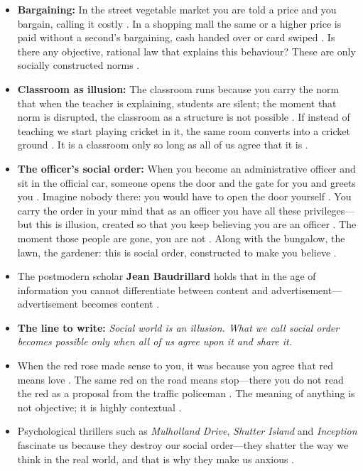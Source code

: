 \begin{ExampleBox}
\begin{itemize}
    \item \textbf{Bargaining:} In the street vegetable market you are told a price and you bargain, calling it costly . In a shopping mall the same or a higher price is paid without a second's bargaining, cash handed over or card swiped . Is there any objective, rational law that explains this behaviour? These are only socially constructed norms .
    \item \textbf{Classroom as illusion:} The classroom runs because you carry the norm that when the teacher is explaining, students are silent; the moment that norm is disrupted, the classroom as a structure is not possible . If instead of teaching we start playing cricket in it, the same room converts into a cricket ground . It is a classroom only so long as all of us agree that it is .
    \item \textbf{The officer's social order:} When you become an administrative officer and sit in the official car, someone opens the door and the gate for you and greets you . Imagine nobody there: you would have to open the door yourself . You carry the order in your mind that as an officer you have all these privileges---but this is illusion, created so that you keep believing you are an officer . The moment those people are gone, you are not . Along with the bungalow, the lawn, the gardener: this is social order, constructed to make you believe .
\end{itemize}
\end{ExampleBox}

\begin{CriticalPoint}
\begin{itemize}
    \item The postmodern scholar \textbf{Jean Baudrillard} holds that in the age of information you cannot differentiate between content and advertisement---advertisement becomes content .
    \item \textbf{The line to write:} \textit{Social world is an illusion. What we call social order becomes possible only when all of us agree upon it and share it.} 
    \item When the red rose made sense to you, it was because you agree that red means love . The same red on the road means stop---there you do not read the red as a proposal from the traffic policeman . The meaning of anything is not objective; it is highly contextual .
    \item Psychological thrillers such as \textit{Mulholland Drive}, \textit{Shutter Island} and \textit{Inception} fascinate us because they destroy our social order---they shatter the way we think in the real world, and that is why they make us anxious .
\end{itemize}
\end{CriticalPoint}

